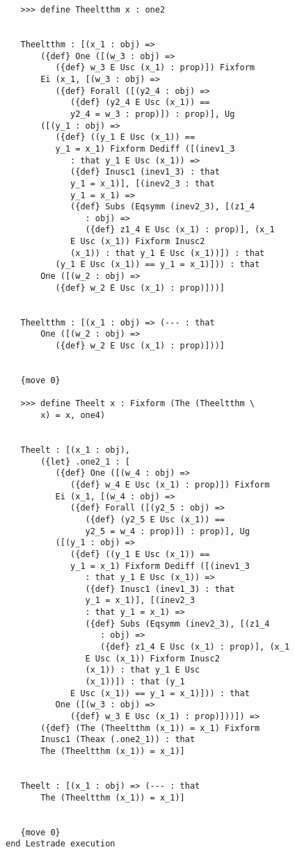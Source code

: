 \documentclass[12pt]{article}
\begin{document}
\begin{verbatim}
   >>> define Theeltthm x : one2


   Theeltthm : [(x_1 : obj) => 
       ({def} One ([(w_3 : obj) => 
          ({def} w_3 E Usc (x_1) : prop)]) Fixform 
       Ei (x_1, [(w_3 : obj) => 
          ({def} Forall ([(y2_4 : obj) => 
             ({def} (y2_4 E Usc (x_1)) == 
             y2_4 = w_3 : prop)]) : prop)], Ug 
       ([(y_1 : obj) => 
          ({def} ((y_1 E Usc (x_1)) == 
          y_1 = x_1) Fixform Dediff ([(inev1_3 
             : that y_1 E Usc (x_1)) => 
             ({def} Inusc1 (inev1_3) : that 
             y_1 = x_1)], [(inev2_3 : that 
             y_1 = x_1) => 
             ({def} Subs (Eqsymm (inev2_3), [(z1_4 
                : obj) => 
                ({def} z1_4 E Usc (x_1) : prop)], (x_1 
             E Usc (x_1)) Fixform Inusc2 
             (x_1)) : that y_1 E Usc (x_1))]) : that 
          (y_1 E Usc (x_1)) == y_1 = x_1)])) : that 
       One ([(w_2 : obj) => 
          ({def} w_2 E Usc (x_1) : prop)]))]


   Theeltthm : [(x_1 : obj) => (--- : that 
       One ([(w_2 : obj) => 
          ({def} w_2 E Usc (x_1) : prop)]))]


   {move 0}

   >>> define Theelt x : Fixform (The (Theeltthm \
       x) = x, one4)


   Theelt : [(x_1 : obj), 
       ({let} .one2_1 : [
          ({def} One ([(w_4 : obj) => 
             ({def} w_4 E Usc (x_1) : prop)]) Fixform 
          Ei (x_1, [(w_4 : obj) => 
             ({def} Forall ([(y2_5 : obj) => 
                ({def} (y2_5 E Usc (x_1)) == 
                y2_5 = w_4 : prop)]) : prop)], Ug 
          ([(y_1 : obj) => 
             ({def} ((y_1 E Usc (x_1)) == 
             y_1 = x_1) Fixform Dediff ([(inev1_3 
                : that y_1 E Usc (x_1)) => 
                ({def} Inusc1 (inev1_3) : that 
                y_1 = x_1)], [(inev2_3 
                : that y_1 = x_1) => 
                ({def} Subs (Eqsymm (inev2_3), [(z1_4 
                   : obj) => 
                   ({def} z1_4 E Usc (x_1) : prop)], (x_1 
                E Usc (x_1)) Fixform Inusc2 
                (x_1)) : that y_1 E Usc 
                (x_1))]) : that (y_1 
             E Usc (x_1)) == y_1 = x_1)])) : that 
          One ([(w_3 : obj) => 
             ({def} w_3 E Usc (x_1) : prop)]))]) => 
       ({def} (The (Theeltthm (x_1)) = x_1) Fixform 
       Inusc1 (Theax (.one2_1)) : that 
       The (Theeltthm (x_1)) = x_1)]


   Theelt : [(x_1 : obj) => (--- : that 
       The (Theeltthm (x_1)) = x_1)]


   {move 0}
end Lestrade execution
\end{verbatim}
\end{document}
